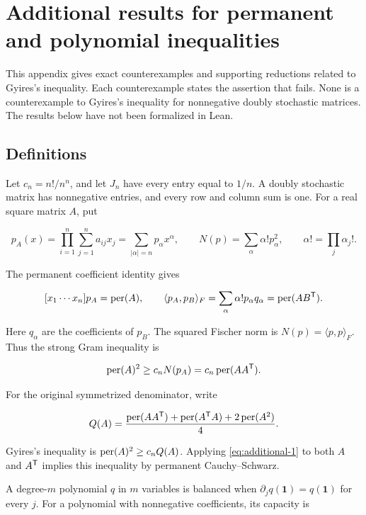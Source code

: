 \section{Additional results for permanent and polynomial inequalities}\label{app:additional-results}

This appendix gives exact counterexamples and supporting reductions related to Gyires's inequality. Each counterexample states the assertion that fails. None is a counterexample to Gyires's inequality for nonnegative doubly stochastic matrices. The results below have not been formalized in Lean.

\subsection{Definitions}\label{app:additional-1}

Let \(c_n=n!/n^n\), and let \(J_n\) have every entry equal to \(1/n\). A doubly stochastic matrix has nonnegative entries, and every row and column sum is one. For a real square matrix \(A\), put

\[
p_A(x)=\prod_{i=1}^n\sum_{j=1}^n a_{ij}x_j
       =\sum_{|\alpha|=n}p_\alpha x^\alpha,
\qquad N(p)=\sum_\alpha\alpha!p_\alpha^2,
\qquad \alpha!=\prod_j\alpha_j!.
\]

The permanent coefficient identity gives

\[
[x_1\cdots x_n]p_A=\operatorname{per}(A),\qquad
\langle p_A,p_B\rangle_F=\sum_\alpha\alpha!p_\alpha q_\alpha
=\operatorname{per}(AB^{\mathsf{T}}).
\]

Here \(q_\alpha\) are the coefficients of \(p_B\). The squared Fischer norm is \(N(p)=\langle p,p\rangle_F\). Thus the strong Gram inequality is

\begin{equation}
\operatorname{per}(A)^2\ge c_n N(p_A)
=c_n\operatorname{per}(AA^{\mathsf{T}}).
\label{eq:additional-1}
\end{equation}

For the original symmetrized denominator, write

\[
Q(A)=\frac{\operatorname{per}(AA^{\mathsf{T}})+\operatorname{per}(A^{\mathsf{T}}A)
+2\operatorname{per}(A^2)}4.
\]

Gyires's inequality is \(\operatorname{per}(A)^2\ge c_nQ(A)\). Applying \eqref{eq:additional-1} to both \(A\) and \(A^{\mathsf{T}}\) implies this inequality by permanent Cauchy--Schwarz.

A degree-\(m\) polynomial \(q\) in \(m\) variables is balanced when \(\partial_jq(\mathbf1)=q(\mathbf1)\) for every \(j\). For a polynomial with nonnegative coefficients, its capacity is

